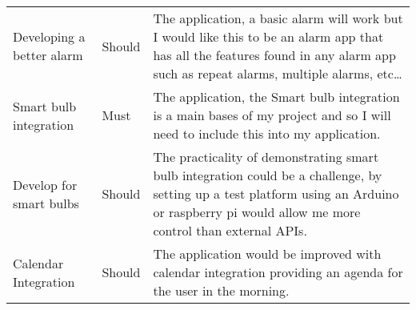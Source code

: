 \begin{longtable}[]{@{}lll@{}}
\begin{minipage}[t]{0.22\columnwidth}\raggedright\strut
Developing a better alarm\strut
\end{minipage} & \begin{minipage}[t]{0.10\columnwidth}\raggedright\strut
Should\strut
\end{minipage} & \begin{minipage}[t]{0.60\columnwidth}\raggedright\strut
The application, a basic alarm will work but I would like this to be an
alarm app that has all the features found in any alarm app such as
repeat alarms, multiple alarms, etc\ldots{}\strut
\end{minipage}\tabularnewline
\begin{minipage}[t]{0.22\columnwidth}\raggedright\strut
Smart bulb integration\strut
\end{minipage} & \begin{minipage}[t]{0.10\columnwidth}\raggedright\strut
Must\strut
\end{minipage} & \begin{minipage}[t]{0.60\columnwidth}\raggedright\strut
The application, the Smart bulb integration is a main bases of my
project and so I will need to include this into my application.\strut
\end{minipage}\tabularnewline
\begin{minipage}[t]{0.22\columnwidth}\raggedright\strut
Develop for smart bulbs\strut
\end{minipage} & \begin{minipage}[t]{0.10\columnwidth}\raggedright\strut
Should\strut
\end{minipage} & \begin{minipage}[t]{0.60\columnwidth}\raggedright\strut
The practicality of demonstrating smart bulb integration could be a
challenge, by setting up a test platform using an Arduino or raspberry
pi would allow me more control than external APIs.\strut
\end{minipage}\tabularnewline
\begin{minipage}[t]{0.22\columnwidth}\raggedright\strut
Calendar Integration\strut
\end{minipage} & \begin{minipage}[t]{0.10\columnwidth}\raggedright\strut
Should\strut
\end{minipage} & \begin{minipage}[t]{0.60\columnwidth}\raggedright\strut
The application would be improved with calendar integration providing an
agenda for the user in the morning.\strut

\end{minipage}
\end{longtable}
